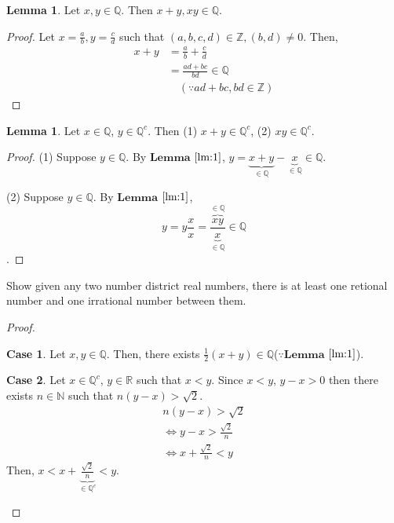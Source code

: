 \documentclass[12pt]{article}
\theoremstyle{definition}
\newtheorem{lemma}[theorem]{Lemma}
\newtheorem{case}{Case}
\newenvironment{problem}[2][Problem]{\begin{trivlist}
    \item[\hskip \labelsep {\bfseries #1}\hskip \labelsep {\bfseries #2.}]}{\end{trivlist}}
\begin{document}
\begin{lemma}\label{lm:1}
    Let $x,y \in \mathbb{Q}$. Then $x+y,xy \in \mathbb{Q}$.
\end{lemma}
\begin{proof}
    Let $x=\frac{a}{b}, y=\frac{c}{d}$ such that $(a,b,c,d) \in \mathbb{Z}, (b,d) \neq 0$. Then,
    \begin{align}
        x+y &= \frac{a}{b}+\frac{c}{d} \\
            &= \frac{ad+bc}{bd} \in \mathbb{Q} \\
            &\quad(\because ad+bc,bd \in \mathbb{Z})
    \end{align}
\end{proof}

\begin{lemma}\label{lm:2}
    Let $x \in \mathbb{Q}$, $y \in \mathbb{Q}^{c}$. Then (1) $x+y \in \mathbb{Q}^{c}$, (2) $xy \in \mathbb{Q}^{c}$.
\end{lemma}
\begin{proof}
    (1) Suppose $y \in \mathbb{Q}$. By $\mathbf{Lemma}$ $\mathbf{\ref{lm:1}}$, $y=\underbrace{x+y}_{\in \mathbb{Q}}-\underbrace{x}_{\in \mathbb{Q}}\in \mathbb{Q}$.

    (2) Suppose $y \in \mathbb{Q}$. By $\mathbf{Lemma}$ $\mathbf{\ref{lm:1}}$, $$y=y\frac{x}{x}=\frac{\overbrace{xy}^{\in \mathbb{Q}}}{\underbrace{x}_{\in \mathbb{Q}}} \in \mathbb{Q}$$.
\end{proof}

\begin{problem}{1}
    Show given any two number district real numbers, there is at least one retional number and one irrational number between them.
\end{problem}
\begin{proof}
    \begin{case}
        Let $x,y \in \mathbb{Q}$. Then, there exists $\frac{1}{2}(x+y) \in \mathbb{Q}$($\because \mathbf{Lemma}$ $\mathbf{\ref{lm:1}}$).
    \end{case}
    \begin{case}
        Let $x \in \mathbb{Q}^{c}$, $y \in \mathbb{R}$ such that $x<y$. Since $x<y$, $y-x>0$ then there exists $n \in \mathbb{N}$ such that $n(y-x)>\sqrt{2}$.
        \begin{align}
            n(y-x)>\sqrt{2} \\
            \Leftrightarrow y-x>\frac{\sqrt{2}}{n} \\
            \Leftrightarrow x+\frac{\sqrt{2}}{n}<y
        \end{align}
        Then, $x<x+\underbrace{\frac{\sqrt{2}}{n}}_{\in \mathbb{Q}^{c}}<y$.
    \end{case}
\end{proof}
\end{document}
